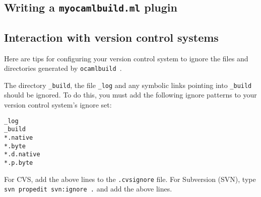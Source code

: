 \documentclass[12pt]{article}
\newcommand{\ocb}{\texttt{ocamlbuild}~}
\begin{document}
\subsection{Writing a \texttt{myocamlbuild.ml} plugin}
\subsection{Interaction with version control systems}
Here are tips for configuring your version control system to ignore the files
and directories generated by \ocb.

The directory \texttt{\_build}, the file \texttt{\_log} and any symbolic links
pointing into \texttt{\_build} should be ignored.
To do this, you must add the following ignore patterns to your version
control system's ignore set:
\begin{verbatim}
_log
_build
*.native
*.byte
*.d.native
*.p.byte
\end{verbatim}

For CVS, add the above lines to the \texttt{.cvsignore} file.
For Subversion (SVN), type \texttt{svn propedit svn:ignore .} and add the
above lines.
\end{document}
